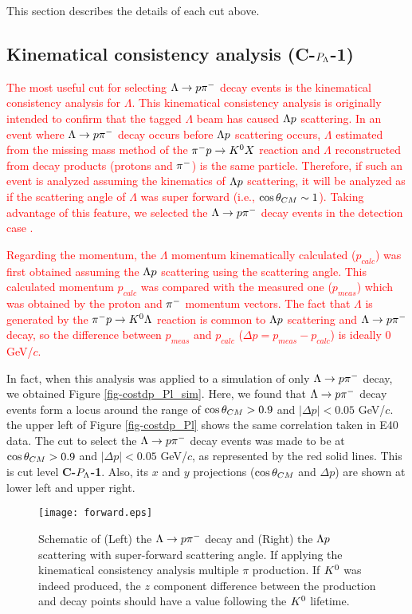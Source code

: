 This section describes the details of each cut above.

\subsection{Kinematical consistency analysis ({\bf C-$P_{\Lambda}$-1})}
\label{sec-Pl-kinema}

\textcolor{red}{ The most useful cut for selecting $\Lambda\to p\pi^{-}$ decay events is the kinematical consistency analysis for $\Lambda$. This kinematical consistency analysis is originally intended to confirm that the tagged $\Lambda$ beam has caused $\Lambda p$ scattering. In an event where $\Lambda\to p\pi^{-}$ decay occurs before $\Lambda p$ scattering occurs, $\Lambda$ estimated from the missing mass method of the $\pi^- p \to K^0 X$ reaction and $\Lambda$ reconstructed from decay products (protons and $\pi^{-}$) is the same particle. Therefore, if such an event is analyzed assuming the kinematics of $\Lambda p$ scattering, it will be analyzed as if the scattering angle of $\Lambda$ was super forward (i.e., $\cos{\theta}_{CM} \sim 1$). Taking advantage of this feature, we selected the $\Lambda\to p\pi^{-}$ decay events in the detection case . }

\textcolor{red}{ Regarding the momentum, the $\Lambda$ momentum kinematically calculated ($p_{calc}$) was first obtained assuming the $\Lambda p$ scattering using the scattering angle. This calculated momentum $p_{calc}$ was compared with the measured one ($p_{meas}$) which was obtained by the proton and $\pi^{-}$ momentum vectors. The fact that $\Lambda$ is generated by the $\pi^- p \to K^0 \Lambda$ reaction is common to $\Lambda p$ scattering and $\Lambda\to p\pi^{-}$ decay, so the difference between $p_{meas}$ and $p_{calc}$ ($\Delta p = p_{meas} - p_{calc}$) is ideally 0 GeV/$c$. }

In fact, when this analysis was applied to a simulation of only $\Lambda\to p\pi^{-}$ decay, we obtained Figure \ref{fig-costdp_Pl_sim}. Here, we found that $\Lambda\to p\pi^{-}$ decay events form a locus around the range of $\cos{\theta}_{CM}>0.9$ and $|\Delta p| < 0.05$ GeV/$c$. the upper left of Figure \ref{fig-costdp_Pl} shows the same correlation taken in E40 data. The cut to select the $\Lambda\to p\pi^{-}$ decay events was made to be at $\cos{\theta}_{CM}>0.9$ and $|\Delta p| < 0.05$ GeV/$c$, as represented by the red solid lines. This is cut level {\bf C-$P_{\Lambda}$-1}. Also, its $x$ and $y$ projections ($\cos{\theta}_{CM}$ and $\Delta p$) are shown at lower left and upper right.

\begin{figure}[h]
  \centering
  \texttt{[image: forward.eps]}
  \caption{Schematic of (Left) the $\Lambda\to p\pi^{-}$ decay and (Right) the $\Lambda p$ scattering with super-forward scattering angle. If applying the kinematical consistency analysis 
  multiple $\pi$ production. If $K^{0}$ was indeed produced, the $z$ component difference between the production and decay points should have a value following the $K^{0}$ lifetime.}
  \label{fig-forward}
\end{figure}

